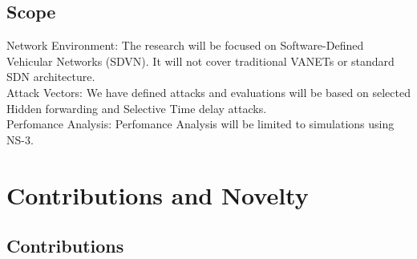 \documentclass[12pt, a4paper]{report}
\begin{document}
\subsection{Scope}

\noindent Network Environment: The research will be focused on Software-Defined Vehicular Networks (SDVN). It will not cover traditional VANETs or standard SDN architecture.\\[\baselineskip]
\noindent Attack Vectors: We have defined attacks and evaluations will be based on selected Hidden forwarding and Selective Time delay attacks.\\[\baselineskip]
\noindent Perfomance Analysis: Perfomance Analysis will be limited to simulations using NS-3.


\section{Contributions and Novelty}


\subsection{Contributions}
\label{sec:contributions}
\end{document}
